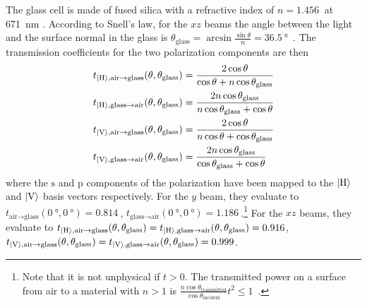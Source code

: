 The glass cell is made of fused silica with a refractive index of $n = \SI{1.456}{}$ at \SI{671}{\nano\meter} \cite{malitson_interspecimen_1965}. According to Snell's law, for the $xz$ beams the angle between the light and the surface normal in the glass is $\theta_\text{glass} = \arcsin \frac{\sin \theta}{n} = \SI{36.5}{\degree}$~\cite{demtroder_elektromagnetische_2013}. The transmission coefficients for the two polarization components are then~\cite{demtroder_elektromagnetische_2013}
\begin{align}\label{eq:fresnel}
    \begin{split}
        t_{\Ket{\text{H}}, \text{air} \rightarrow \text{glass}}(\theta, \theta_\text{glass})  &= \frac{2 \cos \theta}{\cos \theta + n \cos \theta_\text{glass}}\\
        t_{\Ket{\text{H}}, \text{glass} \rightarrow \text{air}}(\theta, \theta_\text{glass})  &= \frac{2n \cos \theta_\text{glass}}{n \cos \theta_\text{glass} + \cos \theta} \\
        t_{\Ket{\text{V}}, \text{air} \rightarrow \text{glass}}(\theta, \theta_\text{glass})  &= \frac{2 \cos \theta}{n \cos \theta + \cos \theta_\text{glass}}\\ 
        t_{\Ket{\text{V}}, \text{glass} \rightarrow \text{air}}(\theta, \theta_\text{glass})  &= \frac{2 n \cos \theta_\text{glass}}{\cos \theta_\text{glass} + \cos \theta}\\ 
    \end{split}
\end{align}
where the $\text{s}$ and $\text{p}$ components of the polarization have been mapped to the $\Ket{\text{H}}$ and $\Ket{\text{V}}$ basis vectors respectively. For the $y$ beam, they evaluate to $t_{\text{air} \rightarrow \text{glass}}(\SI{0}{\degree}, \SI{0}{\degree}) = \SI{0.814}{}$, $t_{\text{glass} \rightarrow \text{air}}(\SI{0}{\degree}, \SI{0}{\degree}) = \SI{1.186}{}$.\footnote{Note that it is not unphysical if $t > 0$. The transmitted power on a surface from air to a material with $n > 1$ is $\frac{n \cos \theta_\text{transmitted}}{\cos \theta_\text{incident}}t^2 \leq 1$~\cite{demtroder_elektromagnetische_2013}.} For the $xz$ beams, they evaluate to $t_{\Ket{\text{H}}, \text{air} \rightarrow \text{glass}}(\theta, \theta_\text{glass}) = t_{\Ket{\text{H}}, \text{glass} \rightarrow \text{air}}(\theta, \theta_\text{glass}) = \SI{0.916}{}$, $t_{\Ket{\text{V}}, \text{air} \rightarrow \text{glass}}(\theta, \theta_\text{glass}) = t_{\Ket{\text{V}}, \text{glass} \rightarrow \text{air}}(\theta, \theta_\text{glass}) = \SI{0.999}{}$.


